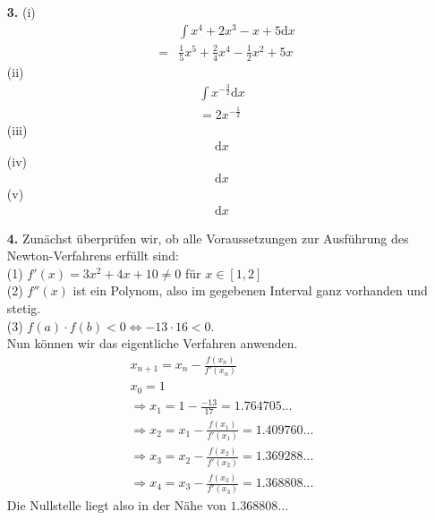 \documentclass[a4paper,11pt]{article}
\begin{document}
\begin{enumerate}
        \item[\textbf{3.}]
	        \subitem (i)
                \begin{align*}
                    &&\int x^4+2x^3-x+5 \mathrm{d}x \\
                    &=&\frac{1}{5}x^5+\frac{2}{4}x^4-\frac{1}{2}x^2+5x
                \end{align*}
            \subitem (ii)
                \begin{align*}
                    \int x^{-\frac{3}{2}} \mathrm{d}x \\
                    = 2x^{-\frac{1}{2}}
                \end{align*}
            \subitem (iii)
                \begin{align*}
                     \mathrm{d}x
                \end{align*}
            \subitem (iv)
                \begin{align*}
                 \mathrm{d}x
                \end{align*}
            \subitem (v)
                \begin{align*}
                 \mathrm{d}x
                \end{align*}
        \item[\textbf{4.}]
            Zunächst überprüfen wir, ob alle Voraussetzungen zur Ausführung des Newton-Verfahrens erfüllt sind:\\
            (1) $f'(x)=3x^2+4x+10 \neq 0$ für $x \in [1,2]$\\
            (2) $f''(x)$ ist ein Polynom, also im gegebenen Interval ganz vorhanden und stetig. \\
            (3) $f(a) \cdot f(b) < 0 \Leftrightarrow -13 \cdot 16 < 0$. \\
            Nun können wir das eigentliche Verfahren anwenden.
            \begin{align*}
                x_{n+1}=x_n - \frac{f(x_n)}{f'(x_n)}\\
                x_0 = 1 \\
                \Rightarrow x_1 = 1- \frac{-13}{17} = 1.764705...\\
                \Rightarrow x_2 = x_1 - \frac{f(x_1)}{f'(x_1)} = 1.409760...\\
                \Rightarrow x_3 = x_2 - \frac{f(x_2)}{f'(x_2)} = 1.369288...\\
                \Rightarrow x_4 = x_3 - \frac{f(x_3)}{f'(x_3)} = 1.368808...
            \end{align*}
            Die Nullstelle liegt also in der Nähe von $1.368808...$
    \end{enumerate}
\end{document}
